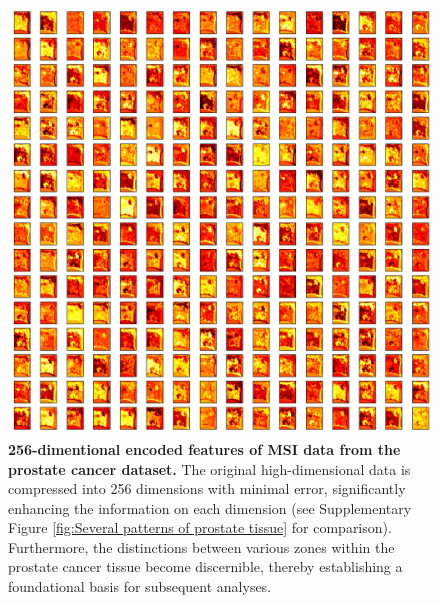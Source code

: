 \documentclass{WileyMSP-template}
\begin{document}
\begin{figure}[]
  \centering
  \includegraphics[width=\textwidth]{pic/encoder_feature_2D_train_pro.png}
  \captionsetup{justification=raggedright,singlelinecheck=false}
  \caption
  {
    \textbf{256-dimentional encoded features of MSI data from the prostate cancer dataset.}
    The original high-dimensional data is compressed 
    into 256 dimensions with minimal error, significantly 
    enhancing the information on each dimension 
    (see Supplementary Figure \ref{fig:Several   patterns of prostate tissue} 
    for comparison). Furthermore, 
    the distinctions between various zones within the prostate 
    cancer tissue become discernible, 
    thereby establishing a foundational basis for subsequent analyses. 
  }
  \label{fig:encoder_feature_2D_train_pro}
\end{figure}
 
\end{document}
